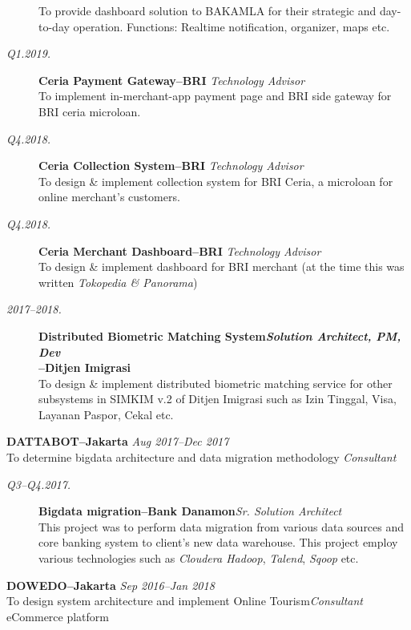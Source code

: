 \documentclass[12pt]{res} %
\begin{document}
\begin{resume}
\begin{description}
    To provide dashboard solution to BAKAMLA for their strategic and day-to-day operation. Functions: Realtime notification, organizer, maps etc.
    \item[{\sl Q1.2019.}] {\bf Ceria Payment Gateway--BRI} \hfill {\sl Technology Advisor}\\
    To implement in-merchant-app payment page and BRI side gateway for BRI ceria microloan.
    \item[{\sl Q4.2018.}] {\bf Ceria Collection System--BRI} \hfill {\sl Technology Advisor}\\
    To design \& implement collection system for BRI Ceria, a microloan for online merchant's customers.
    \item[{\sl Q4.2018.}] {\bf Ceria Merchant Dashboard--BRI} \hfill {\sl Technology Advisor}\\
    To design \& implement dashboard for BRI merchant (at the time this was written {\sl Tokopedia \& Panorama})
    \item[{\sl 2017--2018.}] {\bf Distributed Biometric Matching System\hfill {\sl Solution Architect, PM, Dev}\\--Ditjen Imigrasi}\\
    To design \& implement distributed biometric matching service for other subsystems in SIMKIM v.2 of Ditjen Imigrasi such as Izin Tinggal, Visa, Layanan Paspor, Cekal etc.
\end{description}

{\bf \uppercase{Dattabot}--Jakarta} \hfill {\sl Aug 2017--Dec 2017} \\
To determine bigdata architecture and data migration methodology \hfill {\sl Consultant}

\vspace{10pt} 
\begin{description}
    \item[{\sl Q3--Q4.2017.}] {\bf Bigdata migration--Bank Danamon}\hfill {\sl Sr. Solution Architect}\\
    This project was to perform data migration from various data sources and core banking system to client's new data warehouse. This project
    employ various technologies such as {\sl Cloudera Hadoop}, {\sl Talend}, {\sl Sqoop} etc.
\end{description}

{\bf \uppercase{Dowedo}--Jakarta} \hfill {\sl Sep 2016--Jan 2018} \\
To design system architecture and implement Online Tourism\hfill {\sl Consultant}\\eCommerce platform 


\end{resume}
\end{document}
